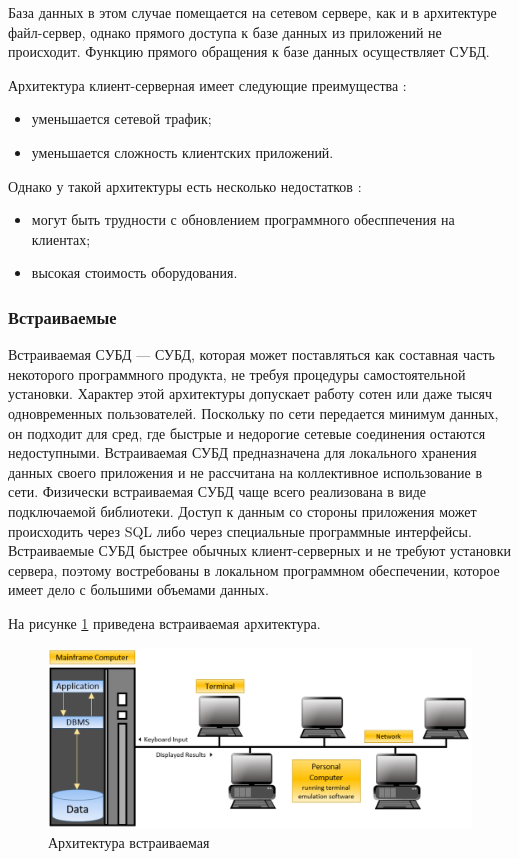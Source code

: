 База данных в этом случае помещается на сетевом сервере, как и в архитектуре файл-сервер, однако прямого доступа к базе данных из приложений не происходит.
Функцию прямого обращения к базе данных осуществляет СУБД.

Архитектура клиент-серверная имеет следующие преимущества \cite{classichoose}:
\begin{itemize}
	\item уменьшается сетевой трафик;
	\item уменьшается сложность клиентских приложений.
\end{itemize}

Однако у такой архитектуры есть несколько недостатков \cite{classichoose}:
\begin{itemize}
	\item могут быть трудности с обновлением программного обесппечения на клиентах;
	\item высокая стоимость оборудования.
\end{itemize}

\subsubsection{Встраиваемые}
Встраиваемая СУБД --- СУБД, которая может поставляться как составная часть
некоторого программного продукта, не требуя процедуры самостоятельной
установки. Характер этой архитектуры допускает работу сотен или даже тысяч одновременных пользователей. Поскольку по сети передается минимум данных, он подходит для сред, где быстрые и недорогие сетевые соединения остаются недоступными. Встраиваемая СУБД предназначена для локального хранения данных
своего приложения и не рассчитана на коллективное использование в сети.
Физически встраиваемая СУБД чаще всего реализована в виде подключаемой
библиотеки. Доступ к данным со стороны приложения может происходить через
SQL либо через специальные программные интерфейсы.
Встраиваемые СУБД быстрее обычных клиент-серверных и не требуют установки
сервера, поэтому востребованы в локальном программном обеспечении, которое имеет дело с большими объемами данных.

На рисунке \ref{img:inline} приведена встраиваемая архитектура.

\begin{figure}[h!]
	\centering
	\includegraphics[height=0.25\textheight]{img/inline} %
	\caption{Архитектура встраиваемая \cite{architec}}
	\label{img:inline}
\end{figure}

